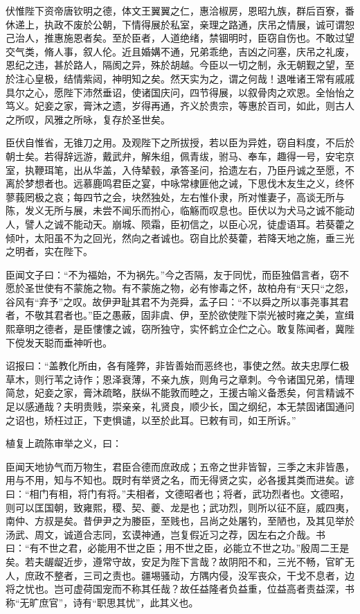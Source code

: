 \documentclass[12pt,UTF8]{ctexbook}
\begin{document}
伏惟陛下资帝唐钦明之德，体文王翼翼之仁，惠洽椒房，恩昭九族，群后百寮，番休递上，执政不废於公朝，下情得展於私室，亲理之路通，庆吊之情展，诚可谓恕己治人，推惠施恩者矣。至於臣者，人道绝绪，禁锢明时，臣窃自伤也。不敢过望交气类，脩人事，叙人伦。近且婚媾不通，兄弟乖绝，吉凶之问塞，庆吊之礼废，恩纪之违，甚於路人，隔阂之异，殊於胡越。今臣以一切之制，永无朝觐之望，至於注心皇极，结情紫闼，神明知之矣。然天实为之，谓之何哉！退唯诸王常有戚戚具尔之心，愿陛下沛然垂诏，使诸国庆问，四节得展，以叙骨肉之欢恩。全怡怡之笃义。妃妾之家，膏沐之遗，岁得再通，齐义於贵宗，等惠於百司，如此，则古人之所叹，风雅之所咏，复存於圣世矣。

臣伏自惟省，无锥刀之用。及观陛下之所拔授，若以臣为异姓，窃自料度，不后於朝士矣。若得辞远游，戴武弁，解朱组，佩青绂，驸马、奉车，趣得一号，安宅京室，执鞭珥笔，出从华盖，入侍辇毂，承答圣问，拾遗左右，乃臣丹诚之至愿，不离於梦想者也。远慕鹿鸣君臣之宴，中咏常棣匪他之诫，下思伐木友生之义，终怀蓼莪罔极之哀；每四节之会，块然独处，左右惟仆隶，所对惟妻子，高谈无所与陈，发义无所与展，未尝不闻乐而拊心，临觞而叹息也。臣伏以为犬马之诚不能动人，譬人之诚不能动天。崩城、陨霜，臣初信之，以臣心况，徒虚语耳。若葵藿之倾叶，太阳虽不为之回光，然向之者诚也。窃自比於葵藿，若降天地之施，垂三光之明者，实在陛下。

臣闻文子曰：“不为福始，不为祸先。”今之否隔，友于同忧，而臣独倡言者，窃不愿於圣世使有不蒙施之物。有不蒙施之物，必有惨毒之怀，故柏舟有“天只“之怨，谷风有“弃予”之叹。故伊尹耻其君不为尧舜，孟子曰：“不以舜之所以事尧事其君者，不敬其君者也。”臣之愚蔽，固非虞、伊，至於欲使陛下崇光被时雍之美，宣缉熙章明之德者，是臣慺慺之诚，窃所独守，实怀鹤立企伫之心。敢复陈闻者，冀陛下傥发天聪而垂神听也。

诏报曰：“盖教化所由，各有隆弊，非皆善始而恶终也，事使之然。故夫忠厚仁极草木，则行苇之诗作；恩泽衰薄，不亲九族，则角弓之章刺。今令诸国兄弟，情理简怠，妃妾之家，膏沐疏略，朕纵不能敦而睦之，王援古喻义备悉矣，何言精诚不足以感通哉？夫明贵贱，崇亲亲，礼贤良，顺少长，国之纲纪，本无禁固诸国通问之诏也，矫枉过正，下吏惧谴，以至於此耳。已敕有司，如王所诉。”

植复上疏陈审举之义，曰：

臣闻天地协气而万物生，君臣合德而庶政成；五帝之世非皆智，三季之末非皆愚，用与不用，知与不知也。既时有举贤之名，而无得贤之实，必各援其类而进矣。谚曰：“相门有相，将门有将。”夫相者，文德昭者也；将者，武功烈者也。文德昭，则可以匡国朝，致雍熙，稷、契、夔、龙是也；武功烈，则所以征不庭，威四夷，南仲、方叔是矣。昔伊尹之为媵臣，至贱也，吕尚之处屠钓，至陋也，及其见举於汤武、周文，诚道合志同，玄谟神通，岂复假近习之荐，因左右之介哉。书曰：“有不世之君，必能用不世之臣；用不世之臣，必能立不世之功。”殷周二王是矣。若夫龌龊近步，遵常守故，安足为陛下言哉？故阴阳不和，三光不畅，官旷无人，庶政不整者，三司之责也。疆埸骚动，方隅内侵，没军丧众，干戈不息者，边将之忧也。岂可虚荷国宠而不称其任哉？故任益隆者负益重，位益高者责益深，书称“无旷庶官”，诗有“职思其忧”，此其义也。
\end{document}
